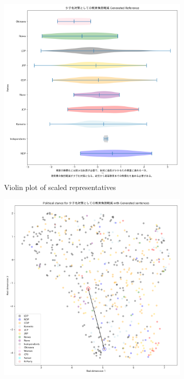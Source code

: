 \documentclass[final,5p,times,twocolumn,authoryear]{elsarticle}
\begin{document}
\begin{figure}[h]
\centering
    \begin{subfigure}{0.22\textwidth}
      \centering
      \includegraphics[width=1\linewidth]{figs/results/aging/少子化対策としての教育負担軽減_gen_violin_plot.png}
      \caption{Violin plot of scaled representatives}
    \end{subfigure}
    \begin{subfigure}{0.22\textwidth}
      \centering
      \includegraphics[width=\linewidth]{figs/results/aging/少子化対策としての教育負担軽減_umap_gen.png}

\end{subfigure}
\end{figure}
\end{document}
